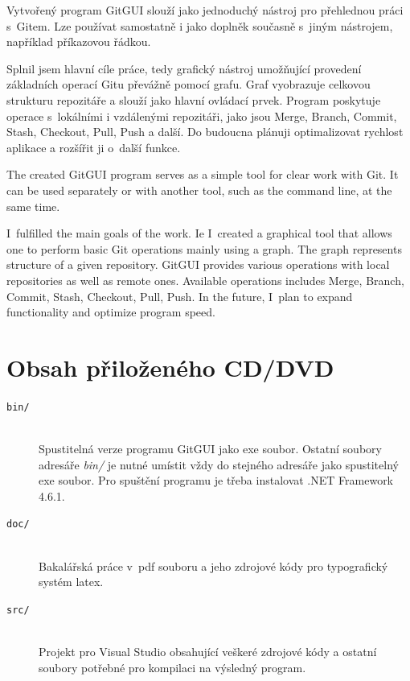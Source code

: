 \documentclass[
  biblatex,
  glossaries,
  index
]{kidiplom}
\begin{document}
\begin{kiconclusions}
Vytvořený program GitGUI slouží jako jednoduchý nástroj pro přehlednou práci s~Gitem. Lze používat samostatně i jako doplněk současně s~jiným nástrojem, například příkazovou řádkou.

Splnil jsem hlavní cíle práce, tedy grafický nástroj umožňující provedení základních operací Gitu převážně pomocí grafu. Graf vyobrazuje celkovou strukturu repozitáře a slouží jako hlavní ovládací prvek. Program poskytuje operace s~lokálními i vzdálenými repozitáři, jako jsou Merge, Branch, Commit, Stash, Checkout, Pull, Push a další. Do budoucna plánuji optimalizovat rychlost aplikace a rozšířit ji o~další funkce.
\end{kiconclusions}

\begin{kiconclusions}[english]
The created GitGUI program serves as a simple tool for clear work with Git. It can be used separately or with another tool, such as the command line, at the same time.

I~fulfilled the main goals of the work. Ie I~created a graphical tool that allows one to perform basic Git operations mainly using a graph. The graph represents structure of a given repository. GitGUI provides various operations with local repositories as well as remote ones. Available operations includes Merge, Branch, Commit, Stash, Checkout, Pull, Push. In the future, I~plan to expand functionality and optimize program speed.

\end{kiconclusions}

\appendix

\section{Obsah přiloženého CD/DVD} \label{sec:ObsahCD}

\begin{description}

\item[\texttt{bin/}] \hfill \\
  Spustitelná verze programu GitGUI jako exe soubor. Ostatní soubory adresáře \textit{bin/} je nutné umístit vždy do stejného adresáře jako spustitelný exe soubor. Pro spuštění programu je třeba instalovat .NET Framework 4.6.1.
  
\item[\texttt{doc/}] \hfill \\
  Bakalářská práce v~pdf souboru a jeho zdrojové kódy pro typografický systém latex.
  
\item[\texttt{src/}] \hfill \\
Projekt pro Visual Studio obsahující veškeré zdrojové kódy a ostatní soubory potřebné pro kompilaci na výsledný program.

\end{description}


\nocite{*}
\printbibliography
\end{document}
